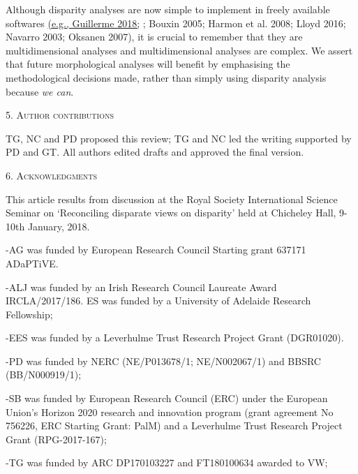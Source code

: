 \documentclass[12pt,letterpaper]{article}
\renewcommand{\section}[1]{%
\bigskip
\begin{center}
\begin{Large}
\normalfont\scshape #1
\medskip
\end{Large}
\end{center}}
\begin{document}
Although disparity analyses are now simple to implement in freely available softwares \href{https://paperpile.com/c/sTGYvp/xDqf+J2G1+9JdS+9Zoi+bCsU+EmTR+2KmX}{(e.g., Guillerme 2018;} {; Bouxin 2005; Harmon et al. 2008; Lloyd 2016; Navarro 2003; Oksanen 2007)},
it is crucial to remember that they are multidimensional analyses and multidimensional analyses are complex.
We assert that future morphological analyses will benefit by emphasising the methodological decisions made, rather than simply using disparity analysis because \emph{we can}.

\hypertarget{author-contributions}{%
\section{5. Author contributions}\label{author-contributions}}

TG, NC and PD proposed this review; TG and NC led the writing supported by PD and GT. All authors edited drafts and approved the final version.

\hypertarget{acknowledgments}{%
\section{6. Acknowledgments}\label{acknowledgments}}

This article results from discussion at the Royal Society International Science Seminar on `Reconciling disparate views on disparity' held at Chicheley Hall, 9-10th January, 2018.

-AG was funded by European Research Council Starting grant 637171 ADaPTiVE.

-ALJ was funded by an Irish Research Council Laureate Award IRCLA/2017/186. ES was funded by a University of Adelaide Research Fellowship;

-EES was funded by a Leverhulme Trust Research Project Grant (DGR01020).

-PD was funded by NERC (NE/P013678/1; NE/N002067/1) and BBSRC (BB/N000919/1);

-SB was funded by European Research Council (ERC) under the European Union's Horizon 2020 research and innovation program (grant agreement No 756226, ERC Starting Grant: PalM) and a Leverhulme Trust Research Project Grant (RPG-2017-167);

-TG was funded by ARC DP170103227 and FT180100634 awarded to VW;
\end{document}
